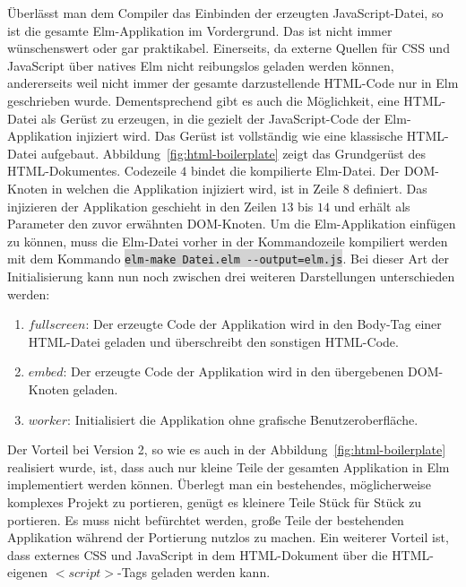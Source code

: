 Überlässt man dem Compiler das Einbinden der erzeugten JavaScript-Datei, so ist die gesamte Elm-Applikation im Vordergrund. Das ist nicht immer wünschenswert oder gar praktikabel. Einerseits, da externe Quellen für CSS und JavaScript über natives Elm nicht reibungslos geladen werden können, andererseits weil nicht immer der gesamte darzustellende HTML-Code nur in Elm geschrieben wurde. Dementsprechend gibt es auch die Möglichkeit, eine HTML-Datei als Gerüst zu erzeugen, in die gezielt der JavaScript-Code der Elm-Applikation injiziert wird. Das Gerüst ist vollständig wie eine klassische HTML-Datei aufgebaut. Abbildung~\ref{fig:html-boilerplate} zeigt das Grundgerüst des HTML-Dokumentes. Codezeile $4$ bindet die kompilierte Elm-Datei. Der \ac{DOM}-Knoten in welchen die Applikation injiziert wird, ist in Zeile $8$ definiert. Das injizieren der Applikation geschieht in den Zeilen $13$ bis $14$ und erhält als Parameter den zuvor erwähnten \ac{DOM}-Knoten. Um die Elm-Applikation einfügen zu können, muss die Elm-Datei vorher in der Kommandozeile kompiliert werden mit dem Kommando \colorbox{lightgray}{\lstinline{elm-make Datei.elm --output=elm.js}}.
Bei dieser Art der Initialisierung kann nun noch zwischen drei weiteren Darstellungen unterschieden werden:
\begin{enumerate}
\item$fullscreen$: Der erzeugte Code der Applikation wird in den Body-Tag einer HTML-Datei geladen und überschreibt den sonstigen HTML-Code.

\item$embed$: Der erzeugte Code der Applikation wird in den übergebenen DOM-Knoten geladen.

\item$worker$: Initialisiert die Applikation ohne grafische Benutzeroberfläche.
\end{enumerate}
Der Vorteil bei Version 2, so wie es auch in der Abbildung~\ref{fig:html-boilerplate} realisiert wurde, ist, dass auch nur kleine Teile der gesamten Applikation in Elm implementiert werden können. Überlegt man ein bestehendes, möglicherweise komplexes Projekt zu portieren, genügt es kleinere Teile Stück für Stück zu portieren. Es muss nicht befürchtet werden, große Teile der bestehenden Applikation während der Portierung nutzlos zu machen. Ein weiterer Vorteil ist, dass externes CSS und JavaScript in dem \ac{HTML}-Dokument über die \ac{HTML}-eigenen $<script>$-Tags geladen werden kann.
